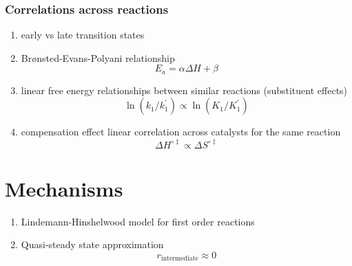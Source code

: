 \documentclass[11pt]{article}
\begin{document}
\subsubsection{Correlations across reactions}
\label{sec:orge0bac76}
\begin{enumerate}
\item early vs late transition states
\item Br\o{}nsted-Evans-Polyani relationship
\[ E_a = \alpha \Delta H + \beta \]
\item linear free energy relationships between similar reactions (substituent effects)
\[ \ln (k_1/k_1^\prime) \propto \ln (K_1/K_1^\prime) \]
\item compensation effect linear correlation across catalysts for the same reaction
\[\Delta H^{\circ\ddagger} \propto \Delta S^{\circ\ddagger}\]
\end{enumerate}
\section{Mechanisms}
\label{sec:org9d63fcf}
\begin{enumerate}
\item Lindemann-Hinshelwood model for first order reactions
\item Quasi-steady state approximation
\[ r_{\text{intermediate}} \approx 0 \]
\end{enumerate}
\end{document}
